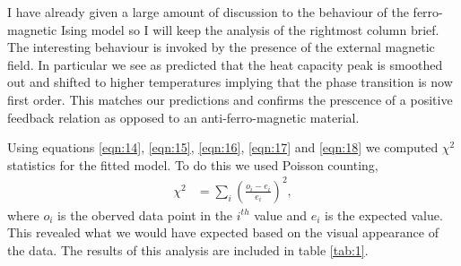 \documentclass[a4paper, twocolumn]{article}
\begin{document}
I have already given a large amount of discussion to the behaviour of %
the ferro-magnetic Ising model so I will keep the analysis of the %
rightmost column brief. The interesting behaviour is invoked by the %
presence of the external magnetic field. In particular we see as predicted %
that the heat capacity peak is smoothed out and shifted to higher %
temperatures implying that the phase transition is now first order. %
This matches our predictions and confirms the prescence of a positive %
feedback relation as opposed to an anti-ferro-magnetic material. 


Using equations \ref{eqn:14}, \ref{eqn:15}, \ref{eqn:16}, \ref{eqn:17} and %
\ref{eqn:18} we computed \(\chi^{2}\) statistics for the fitted model. %
To do this we used Poisson counting,
%
\begin{align}
    \chi^{2} &= \sum_{i}\left(\frac{o_{i} - e_{i}}{e_{i}}\right)^{2},
    \label{eqn:19}
\end{align}
%
where \(o_{i}\) is the oberved data point in the \(i^{th}\) value and %
\(e_{i}\) is the expected value. This revealed what we would have expected %
based on the visual appearance of the data. The results of this analysis %
are included in table \ref{tab:1}.
\end{document}
